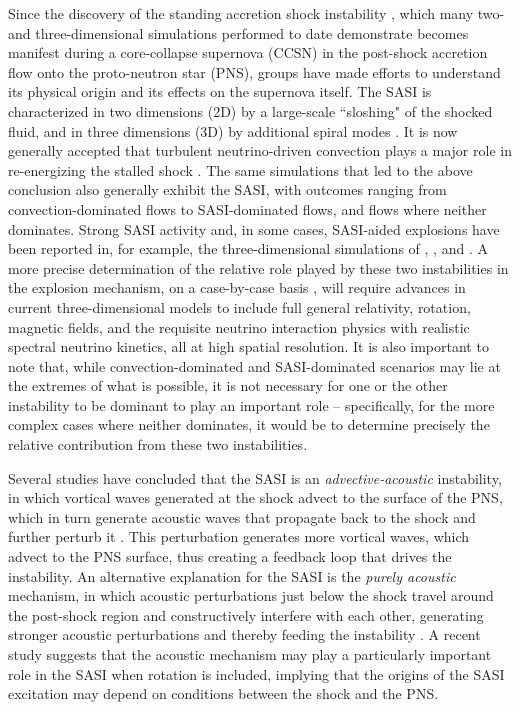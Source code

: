 Since the discovery of the standing accretion shock instability
\citep[SASI;][]{bmd2003}, which many two- and three-dimensional simulations
performed to date demonstrate becomes manifest during a
core-collapse supernova (CCSN) in the post-shock accretion flow
onto the proto-neutron star (PNS),
groups have made efforts to understand its physical origin
and its effects on the supernova itself.
The SASI is characterized in two dimensions (2D) by a large-scale
``sloshing" of the shocked fluid,
and in three dimensions (3D) by additional spiral modes \citep{bm2007}.
It is now generally accepted that turbulent neutrino-driven convection
plays a major role in re-energizing the stalled shock
\citep[e.g., see][]{%
bdm2012,
hmw2013,
mdb2013,
co2015,
mjm2015,
lbh2015,
aor2015,
rco2015,
mjm2015,
mjb2015,
roh2016,
mmh2017,
sjm2018,
rao2018,
oc2018b,
vbr2019,
mth2019,
brv2019,
ytk2019,
pm2020,
sjk2020,
mv2020,
vcb2022,
ntk2022,
mat2022%
}.
The same simulations that led to the above conclusion also generally exhibit
the SASI, with outcomes ranging from convection-dominated flows to
SASI-dominated flows, and flows where neither dominates.
Strong SASI activity and, in some cases, SASI-aided explosions have been
reported in, for example, the three-dimensional simulations of
\cite{sjm2018}, \cite{oc2018b}, and \cite{mat2022}.
A more precise determination of the relative role played by these two
instabilities in the explosion mechanism, on a case-by-case basis
\citep[i.e., for different progenitor characteristics; e.g., see][]{%
sjf2008,
hmm2012,
hmw2013,
co2014,
fmf2014,
mjb2015,
aor2015,
f2015%
}, will require advances in current three-dimensional models to include full
general relativity,
rotation, magnetic fields, and the requisite neutrino interaction physics
with realistic spectral neutrino kinetics, all at high spatial resolution.
It is also important to note that, while
convection-dominated and SASI-dominated scenarios may lie at the extremes of
what is possible, it is not necessary for one or the other instability to be
dominant to play an important role -- specifically, for the more complex cases
where neither dominates,
it would be 
to determine precisely the relative
contribution from these two instabilities.

Several studies have concluded that the SASI is an
{\sl  advective-acoustic} instability, in which
vortical waves generated at the shock advect to the surface of the PNS,
which in turn generate acoustic waves that propagate back to the
shock and further perturb it
\citep{fsj2006,fgs2007,yy2007,l2007,l2008,f2009,gf2012}.
This perturbation generates more vortical waves,
which advect to
the PNS surface, thus creating a feedback loop that drives the instability.
An alternative explanation for the SASI is the
{\sl purely acoustic} mechanism, in which
acoustic perturbations just below the shock travel around
the post-shock region and constructively interfere with each other,
generating stronger acoustic perturbations
and thereby feeding the instability
\citep{bm2006}.
A recent study \citep{wft2023} suggests that the acoustic mechanism may play
a particularly important role in the SASI when rotation is included,
implying that the origins of the SASI excitation may depend on conditions
between the shock and the PNS.

